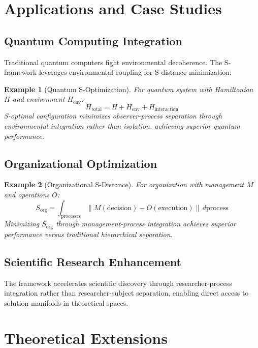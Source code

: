 \documentclass[11pt]{article}
\newtheorem{example}{Example}
\begin{document}
\section{Applications and Case Studies}

\subsection{Quantum Computing Integration}

Traditional quantum computers fight environmental decoherence. The S-framework leverages environmental coupling for S-distance minimization:

\begin{example}[Quantum S-Optimization]
For quantum system with Hamiltonian $H$ and environment $H_{\text{env}}$:
\begin{equation}
H_{\text{total}} = H + H_{\text{env}} + H_{\text{interaction}}
\end{equation}
S-optimal configuration minimizes observer-process separation through environmental integration rather than isolation, achieving superior quantum performance.
\end{example}

\subsection{Organizational Optimization}

\begin{example}[Organizational S-Distance]
For organization with management $M$ and operations $O$:
\begin{equation}
S_{\text{org}} = \int_{\text{processes}} \|M(\text{decision}) - O(\text{execution})\| \, d\text{process}
\end{equation}
Minimizing $S_{\text{org}}$ through management-process integration achieves superior performance versus traditional hierarchical separation.
\end{example}

\subsection{Scientific Research Enhancement}

The framework accelerates scientific discovery through researcher-process integration rather than researcher-subject separation, enabling direct access to solution manifolds in theoretical spaces.

\section{Theoretical Extensions}
\end{document}
